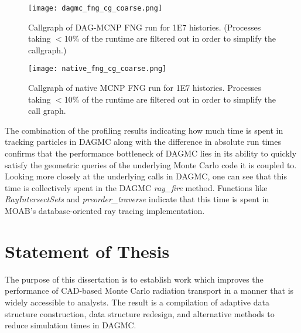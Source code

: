 \begin{figure}[H]
  \centering
  \caption{Callgraph of DAG-MCNP FNG run for \num{1E7} histories. (Processes taking
    $<$10\% of the runtime are filtered out in order to simplify the callgraph.)}
  \label{dagmc-fng-coarse}
  \texttt{[image: dagmc\_fng\_cg\_coarse.png]}
\end{figure}

\begin{figure}[H]
  \centering
  \caption{Callgraph of native MCNP FNG run for \num{1E7} histories. Processes taking
    $<$10\% of the runtime are filtered out in order to simplify the call
    graph.}
  \label{mcnp-fng-coarse}
  \texttt{[image: native\_fng\_cg\_coarse.png]}
\end{figure}


The combination of the profiling results indicating how much time is spent in
tracking particles in DAGMC along with the difference in absolute run times
confirms that the performance bottleneck of DAGMC lies in its ability to quickly
satisfy the geometric queries of the underlying Monte Carlo code it is coupled
to. Looking more closely at the underlying calls in DAGMC, one can see that this
time is collectively spent in the DAGMC \textit{ray\_fire} method. Functions
like \textit{RayIntersectSets} and \textit{preorder\_traverse} indicate that
this time is spent in MOAB's database-oriented ray tracing implementation.

\section{Statement of Thesis}

The purpose of this dissertation is to establish work which improves the
performance of CAD-based Monte Carlo radiation transport in a manner that is
widely accessible to analysts. The result is a compilation of adaptive data
structure construction, data structure redesign, and alternative methods to
reduce simulation times in DAGMC.
